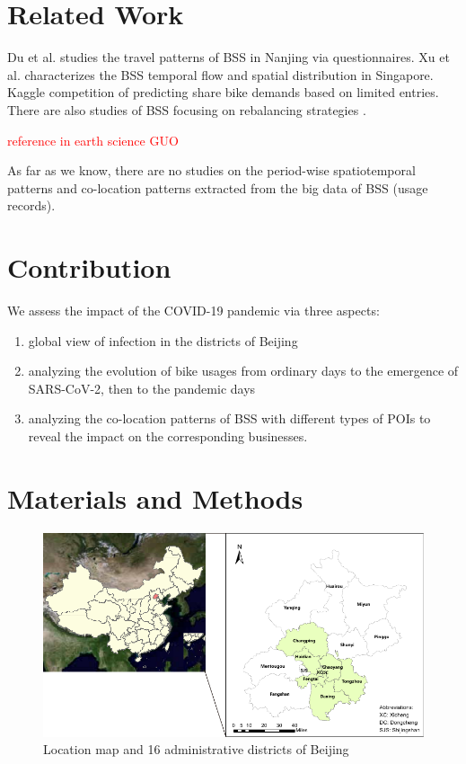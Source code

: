 \documentclass[preprints,ijgi,submit,moreauthors]{Definitions/mdpi}
\begin{document}
\section*{Related Work}
Du et al. \cite{du2018better} studies the travel patterns of BSS in Nanjing via questionnaires.
Xu et al. \cite{xu2019unravel} characterizes the BSS temporal flow and spatial distribution in Singapore.
Kaggle \cite{kaggle} competition of predicting share bike demands based on limited entries.
There are also studies of BSS focusing on rebalancing strategies \cite{pal2017free, ai2019deep}.


\textcolor{red}{reference in earth science GUO}

As far as we know, there are no studies on the period-wise spatiotemporal patterns and co-location patterns extracted from the big data of BSS (usage records).

\section*{Contribution} We assess the impact of the COVID-19 pandemic via three aspects:
\begin{enumerate}
    \item global view of infection in the districts of Beijing
    \item analyzing the evolution of bike usages from ordinary days to the emergence of SARS-CoV-2, then to the pandemic days
    \item analyzing the co-location patterns of BSS with different types of POIs to reveal the impact on the corresponding businesses.
\end{enumerate}

\section{Materials and Methods}

\begin{figure}[H]
    \centering
    \includegraphics[width=\textwidth]{Figures/StudyArea.pdf}
    \caption{Location map and 16 administrative districts of Beijing}
    \label{fig:study_area}
\end{figure}
\end{document}
